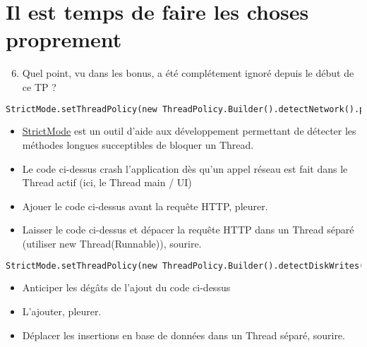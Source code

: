 \documentclass{article}
\begin{document}
\section{Il est temps de faire les choses proprement}
\begin{enumerate}
 \setcounter{enumi}{5}
\item Quel point, vu dans les bonus, a été complétement ignoré depuis le début de ce TP ?
\end{enumerate}
 \begin{lstlisting}[language=XML]
 StrictMode.setThreadPolicy(new ThreadPolicy.Builder().detectNetwork().penaltyDeathOnNetwork().build());
\end{lstlisting}
\begin{itemize} 
  \item \href{http://developer.android.com/reference/android/os/StrictMode.html}{StrictMode} est un outil d'aide aux développement permettant de détecter les méthodes longues succeptibles de bloquer un Thread.
  \item Le code ci-dessus crash l'application dès qu'un appel réseau est fait dans le Thread actif (ici, le Thread main / UI)
  \item Ajouer le code ci-dessus avant la requête HTTP, pleurer.
  \item Laisser le code ci-dessus et dépacer la requête HTTP dans un Thread séparé (utiliser new Thread(Runnable)), sourire.
\end{itemize}
\begin{lstlisting}[language=XML]
 StrictMode.setThreadPolicy(new ThreadPolicy.Builder().detectDiskWrites().penaltyDeath().build());
\end{lstlisting}
\begin{itemize} 
  \item Anticiper les dégâts de l'ajout du code ci-dessus
  \item L'ajouter, pleurer.
  \item Déplacer les insertions en base de données dans un Thread séparé, sourire.
\end{itemize}
\end{document}
